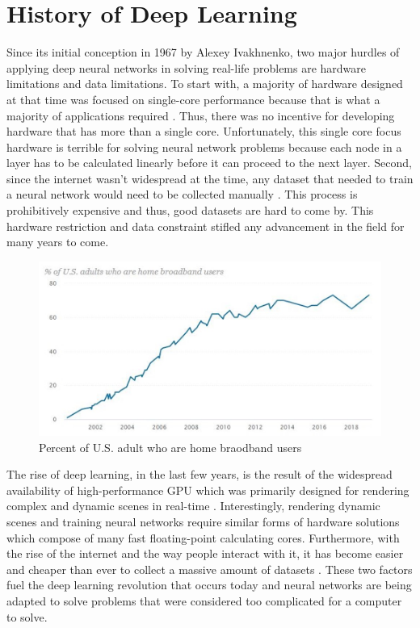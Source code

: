 \documentclass{IEEEtran}
\begin{document}
    
    \section{History of Deep Learning}
        Since its initial conception in 1967 by Alexey Ivakhnenko, two major hurdles of applying deep neural networks in solving real-life problems are hardware limitations and data limitations. To start with, a majority of hardware designed at that time was focused on single-core performance because that is what a majority of applications required \cite{inproceedings}. Thus, there was no incentive for developing hardware that has more than a single core. Unfortunately, this single core focus hardware is terrible for solving neural network problems because each node in a layer has to be calculated linearly before it can proceed to the next layer. Second, since the internet wasn’t widespread at the time, any dataset that needed to train a neural network would need to be collected manually \cite{pew_research_center}. This process is prohibitively expensive and thus, good datasets are hard to come by. This hardware restriction and data constraint stifled any advancement in the field for many years to come.

        \begin{figure}[!htb]
            \centering
            \captionsetup{justification=centering}
            \includegraphics[width=\linewidth]{USBroadband.png}
            \caption{Percent of U.S. adult who are home braodband users}  
        \end{figure}

        The rise of deep learning, in the last few years, is the result of the widespread availability of high-performance GPU which was primarily designed for rendering complex and dynamic scenes in real-time \cite{nickolls_dally_2010}. Interestingly, rendering dynamic scenes and training neural networks require similar forms of hardware solutions which compose of many fast floating-point calculating cores. Furthermore, with the rise of the internet and the way people interact with it, it has become easier and cheaper than ever to collect a massive amount of datasets \cite{deng_dong_socher_li_li_fei-fei_2009}. These two factors fuel the deep learning revolution that occurs today and neural networks are being adapted to solve problems that were considered too complicated for a computer to solve.
        
\end{document}
